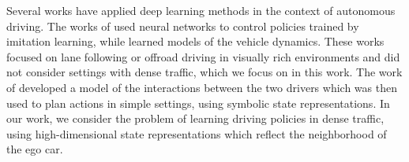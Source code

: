 \documentclass{article} %
\begin{document}
Several works have applied deep learning methods in the context of autonomous driving. The works of \citep{Pomerleau91, LeCun2006, Bojarski16, Pan17} used neural networks to control policies trained by imitation learning, while \citep{Williams2017} learned models of the vehicle dynamics. These works focused on lane following or offroad driving in visually rich environments and did not consider settings with dense traffic, which we focus on in this work. The work of \citep{Sadigh16} developed a model of the interactions between the two drivers which was then used to plan actions in simple settings, using symbolic state representations. In our work, we consider the problem of learning driving policies in dense traffic, using high-dimensional state representations which reflect the neighborhood of the ego car. %



\end{document}
